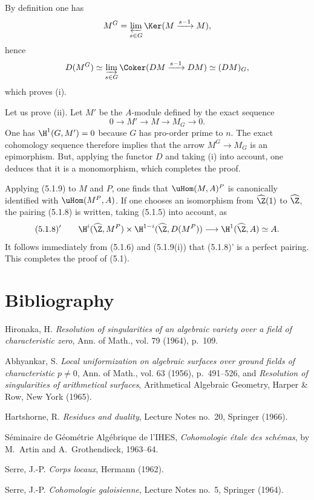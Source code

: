 \begin{prooftext}[Proof]
By definition one has
\[
M^G=\varprojlim_{s\in G}\Ker(M\xrightarrow{s-1}M),
\]
hence
\[
D(M^G)\simeq \varinjlim_{s\in G}\Coker(DM\xrightarrow{s-1}DM)\simeq (DM)_G,
\]
which proves (i).

Let us prove (ii). Let $M'$ be the $A$-module defined by the exact sequence
\[
0\longrightarrow M'\longrightarrow M\longrightarrow M_G\longrightarrow0.
\]
One has $\H^1(G,M')=0$ because $G$ has pro-order prime to $n$. The exact cohomology sequence therefore implies that the arrow $M^G\to M_G$ is an epimorphism. But, applying the functor $D$ and taking (i) into account, one deduces that it is a monomorphism, which completes the proof.
\end{prooftext}

Applying (5.1.9) to $M$ and $P$, one finds that $\uHom(M,A)^P$ is canonically identified with $\uHom(M^P,A)$. If one chooses an isomorphism from $\widehat{\Z}(1)$ to $\widehat{\Z}$, the pairing (5.1.8) is written, taking (5.1.5) into account, as
\[
(5.1.8)'\qquad \H^i(\widehat{\Z},M^P)\times\H^{1-i}(\widehat{\Z},D(M^P))\longrightarrow\H^1(\widehat{\Z},A)\simeq A.
\]
It follows immediately from (5.1.6) and (5.1.9(i)) that (5.1.8)' is a perfect pairing. This completes the proof of (5.1).

\section*{Bibliography}

\begin{description}[leftmargin=2.5cm,style=nextline]
\item[{[2]}] Hironaka, H. \emph{Resolution of singularities of an algebraic variety over a field of characteristic zero}, Ann. of Math., vol. 79 (1964), p.~109.
\item[{[1]}] Abhyankar, S. \emph{Local uniformization on algebraic surfaces over ground fields of characteristic $p\ne0$}, Ann. of Math., vol. 63 (1956), p.~491--526, and \emph{Resolution of singularities of arithmetical surfaces}, Arithmetical Algebraic Geometry, Harper \& Row, New York (1965).
\item[{[H]}] Hartshorne, R. \emph{Residues and duality}, Lecture Notes no.~20, Springer (1966).
\item[{[SGAA]}] Séminaire de Géométrie Algébrique de l'IHES, \emph{Cohomologie étale des schémas}, by M.~Artin and A.~Grothendieck, 1963--64.
\item[{[CL]}] Serre, J.-P. \emph{Corps locaux}, Hermann (1962).
\item[{[CG]}] Serre, J.-P. \emph{Cohomologie galoisienne}, Lecture Notes no.~5, Springer (1964).
\end{description}

